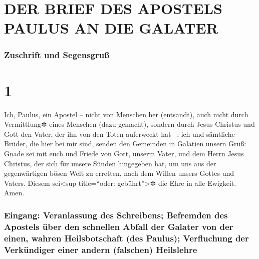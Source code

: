 \hypertarget{der-brief-des-apostels-paulus-an-die-galater}{%
\section{DER BRIEF DES APOSTELS PAULUS AN DIE
GALATER}\label{der-brief-des-apostels-paulus-an-die-galater}}

\hypertarget{zuschrift-und-segensgruuxdf}{%
\subsubsection{Zuschrift und
Segensgruß}\label{zuschrift-und-segensgruuxdf}}

\hypertarget{section}{%
\section{1}\label{section}}

 Ich, Paulus, ein Apostel -- nicht von Menschen her
(entsandt), auch nicht durch Vermittlung✲ eines Menschen (dazu gemacht),
sondern durch Jesus Christus und Gott den Vater, der ihn von den Toten
auferweckt hat --:  ich und sämtliche Brüder, die hier bei
mir sind, senden den Gemeinden in Galatien unsern Gruß: 
Gnade sei mit euch und Friede von Gott, unserm Vater, und dem Herrn
Jesus Christus,  der sich für unsere Sünden hingegeben
hat, um uns aus der gegenwärtigen bösen Welt zu erretten, nach dem
Willen unsers Gottes und Vaters.  Diesem sei\textless sup
title=``oder: gebührt''\textgreater✲ die Ehre in alle Ewigkeit. Amen.

\hypertarget{eingang-veranlassung-des-schreibens-befremden-des-apostels-uxfcber-den-schnellen-abfall-der-galater-von-der-einen-wahren-heilsbotschaft-des-paulus-verfluchung-der-verkuxfcndiger-einer-andern-falschen-heilslehre}{%
\subsubsection{Eingang: Veranlassung des Schreibens; Befremden des
Apostels über den schnellen Abfall der Galater von der einen, wahren
Heilsbotschaft (des Paulus); Verfluchung der Verkündiger einer andern
(falschen)
Heilslehre}\label{eingang-veranlassung-des-schreibens-befremden-des-apostels-uxfcber-den-schnellen-abfall-der-galater-von-der-einen-wahren-heilsbotschaft-des-paulus-verfluchung-der-verkuxfcndiger-einer-andern-falschen-heilslehre}}

